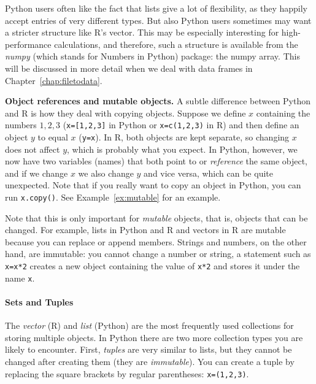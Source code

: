 
Python users often like the fact that lists give  a lot of flexibility, as they happily accept
entries of very different types. But also Python users sometimes may want a stricter
structure like R's vector. This may be especially interesting for
high-performance calculations, and therefore, such a structure is
available from the \emph{numpy} (which stands for Numbers in Python)
package: the numpy array.
This will be discussed in more detail when we deal with data frames in Chapter~\ref{chap:filetodata}.


\begin{feature}\textbf{Object references and mutable objects.}
  A subtle difference between Python and R is how they deal with copying objects.
  Suppose we define $x$ containing the numbers $1,2,3$ (\verb|x=[1,2,3]| in Python or \verb|x=c(1,2,3)| in R)
  and then define an object $y$ to equal $x$ (\verb|y=x|).
  In R, both objects are kept separate, so changing $x$ does not affect $y$,
  which is probably what you expect.
  In Python, however, we now have two variables (names) that both point to or \emph{reference} the same object,
  and if we change $x$ we also change $y$ and vice versa, which can be quite unexpected.
  Note that if you really want to copy an object in Python, you can run \verb|x.copy()|.
  See Example~\ref{ex:mutable} for an example. 

  Note that this is only important for \emph{mutable} objects, that is,
  objects that can be changed.
  For example, lists in Python and R and vectors in R are mutable because you can replace or append members.
  Strings and numbers, on the other hand, are immutable:
  you cannot change a number or string, a statement such as \verb|x=x*2| creates a new object containing the value of \verb|x*2| and stores it under the name \verb|x|.

\end{feature}
  

\paragraph{Sets and Tuples}
The \emph{vector} (R) and \emph{list} (Python) are the most frequently used collections
for storing multiple objects. 
In Python there are two more collection types you are likely to encounter.
First, \emph{tuples} are very similar to lists, but they cannot be changed after creating them
(they are \emph{immutable}).
You can create a tuple by replacing the square brackets by regular parentheses:
\verb|x=(1,2,3)|. 


